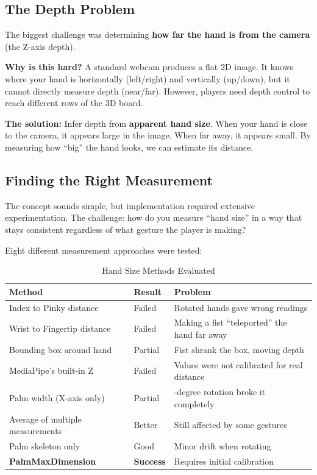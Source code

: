 \documentclass[11pt]{article}
\begin{document}
\subsection{The Depth Problem}

The biggest challenge was determining \textbf{how far the hand is from the camera} (the Z-axis depth).

\textbf{Why is this hard?} A standard webcam produces a flat 2D image. It knows where your hand is horizontally (left/right) and vertically (up/down), but it cannot directly measure depth (near/far). However, players need depth control to reach different rows of the 3D board.

\textbf{The solution:} Infer depth from \textbf{apparent hand size}. When your hand is close to the camera, it appears large in the image. When far away, it appears small. By measuring how ``big'' the hand looks, we can estimate its distance.


\subsection{Finding the Right Measurement}

The concept sounds simple, but implementation required extensive experimentation. The challenge: how do you measure ``hand size'' in a way that stays consistent regardless of what gesture the player is making?

Eight different measurement approaches were tested:

\begin{table}[H]
\centering
\caption{Hand Size Methods Evaluated}
\begin{tabular}{>{\raggedright\arraybackslash}p{4cm}>{\raggedright\arraybackslash}p{2cm}>{\raggedright\arraybackslash}p{6cm}}
\toprule
\textbf{Method} & \textbf{Result} & \textbf{Problem} \\
\midrule
Index to Pinky distance & Failed & Rotated hands gave wrong readings \\
Wrist to Fingertip distance & Failed & Making a fist ``teleported'' the hand far away \\
Bounding box around hand & Partial & Fist shrank the box, moving depth \\
MediaPipe's built-in Z & Failed & Values were not calibrated for real distance \\
Palm width (X-axis only) & Partial & 90-degree rotation broke it completely \\
Average of multiple measurements & Better & Still affected by some gestures \\
Palm skeleton only & Good & Minor drift when rotating \\
\textbf{PalmMaxDimension} & \textbf{Success} & Requires initial calibration \\
\bottomrule
\end{tabular}
\end{table}
\end{document}
